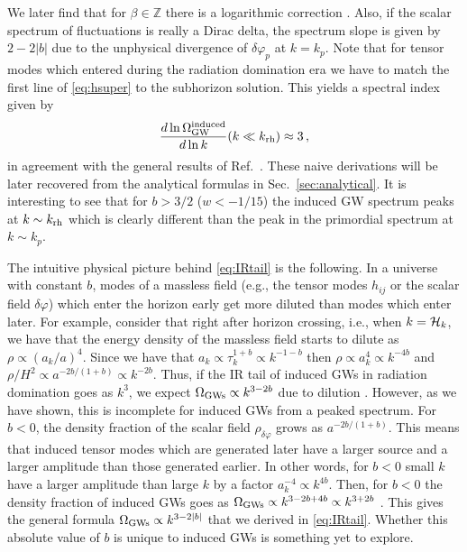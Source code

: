 \documentclass[a4paper,11pt]{article}
\numberwithin{equation}{section}
\begin{document}
We later find that for $\beta\in\mathbb{Z}$ there is a logarithmic correction \cite{Domenech:2020kqm}. Also, if the scalar spectrum of fluctuations is really a Dirac delta, the spectrum slope is given by $2-2|b|$ due to the unphysical divergence of $\delta\varphi_p$ at $k=k_p$. Note that for tensor modes which entered during the radiation domination era we have to match the first line of \eqref{eq:hsuper} to the subhorizon solution. This yields a spectral index given by
\begin{equation}\label{eq:IRtail2}
\frac{d\ln\Omega_{\rm GW}^{\rm induced}}{d\ln k}(k\ll k_{\rm rh})\approx 3\,,
\end{equation}
in agreement with the general results of Ref.~\cite{Cai:2019cdl}. These naive derivations will be later recovered from the analytical formulas in Sec.~\ref{sec:analytical}. It is interesting to see that for $b>3/2$ ($w<-1/15$) the induced GW spectrum peaks at $k\sim k_{\rm rh}$ which is clearly different than the peak in the primordial spectrum at $k\sim k_p$.

The intuitive physical picture behind \eqref{eq:IRtail} is the following. In a universe with constant $b$, modes of a massless field (e.g., the tensor modes $h_{ij}$ or the scalar field $\delta\varphi$) which enter the horizon early get more diluted than modes which enter later. For example, consider that right after horizon crossing, i.e., when $k={\cal H}_k$, we have that the energy density of the massless field starts to dilute as $\rho\propto (a_k/a)^{4}$. Since we have that $a_k\propto \tau_k^{1+b}\propto k^{-1-b}$ then $\rho\propto a_k^{4}\propto k^{-4b}$ and $\rho/H^2\propto a^{-2b/(1+b)}\propto k^{-2b}$. Thus, if the IR tail of induced GWs in radiation domination goes as $k^3$, we expect $\Omega_{\rm GWs}\propto k^{3-2b}$ due to dilution \cite{Cai:2019cdl}. However, as we have shown, this is incomplete for induced GWs from a peaked spectrum. For $b<0$, the density fraction of the scalar field $\rho_{\delta\varphi}$ grows as $a^{-2b/(1+b)}$. This means that induced tensor modes which are generated later have a larger source and a larger amplitude than those generated earlier. In other words, for $b<0$ small $k$ have a larger amplitude than large $k$ by a factor $a_k^{-4}\propto k^{4b}$. Then, for $b<0$ the density fraction of induced GWs goes as $\Omega_{\rm GWs}\propto k^{3-2b+4b}\propto k^{3+2b}$ \cite{Domenech:2020kqm}. This gives the general formula $\Omega_{\rm GWs}\propto  k^{3-2|b|}$ that we derived in \eqref{eq:IRtail}. Whether this absolute value of $b$ is unique to induced GWs is something yet to explore.
\end{document}
